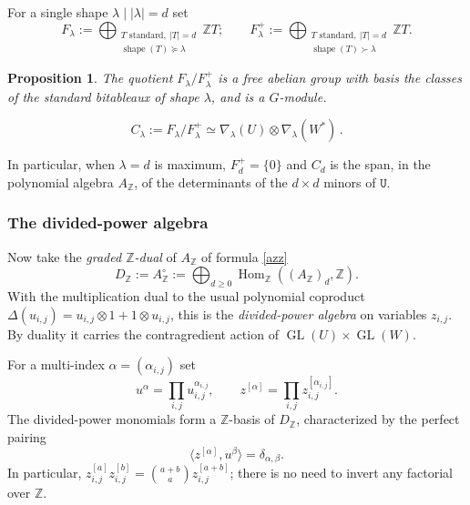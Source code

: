 \documentclass[10pt]{amsart}
\newtheorem{proposition}[theorem]{Proposition}
\theoremstyle{definition}
\theoremstyle{remark}
\newcommand{\GL}{\operatorname{GL}}
\begin{document}
 For a single shape
$\lambda \mid |\lambda|=d$ set
\begin{equation}\label{glifl}
F_{\lambda}:=
 \bigoplus_{\substack{T\text{ standard},\ |T|=d\\
                  \operatorname{shape}(T) \succeq \lambda}}
 \mathbb ZT;\qquad F^+_{\lambda}:=
 \bigoplus_{\substack{T\text{ standard},\ |T|=d\\
                  \operatorname{shape}(T)\succ \lambda}}
 \mathbb ZT. 
\end{equation} 
\begin{proposition}\label{grmod}
 The quotient $ F_\lambda/ F^+_{\lambda}$  is a free abelian group with basis the classes of the standard bitableaux of shape $\lambda$, and is a $G$-module.
 
 \begin{equation}\label{clam}
 C_\lambda:=F_\lambda/ F^+_{\lambda}\simeq\nabla_{\lambda}(U)\otimes\nabla_{\lambda}(W^{*})\,.
\end{equation}
\end{proposition}
In particular, when $\lambda=d$ is maximum, $F^+_{d}=\{0\}$  and $C_d$ is the span, in the polynomial algebra $A_{\mathbb Z}$, of the determinants of the $d\times d$ minors of $\mathtt U$.
 \smallskip


\subsubsection{The divided-power algebra}
Now take the \emph{graded $\mathbb Z$-dual} of $A_{\mathbb Z}$ of formula \eqref{azz}
\begin{equation}\label{podi}
 D_{\mathbb Z}:=A_{\mathbb Z}^{\circ}
 :=\bigoplus_{d\geq0}\operatorname{Hom}_{\mathbb Z}
 ((A_{\mathbb Z})_d,\mathbb Z).
\end{equation}
With the multiplication dual to the usual polynomial coproduct
$\Delta(u_{i,j})=u_{i,j}\otimes1+1\otimes u_{i,j}$,
this is the {\em divided-power algebra} on variables $z_{i,j}$.  By duality it carries the contragredient action of $\GL(U)\times\GL(W)$.\smallskip

For a multi-index $\alpha=(\alpha_{i,j})$ set
\[
  u^\alpha=\prod_{i,j} u_{i,j}^{\alpha_{i,j}},
 \qquad
 z^{[\alpha]}=\prod_{i,j}z_{i,j}^{[\alpha_{i,j}]}.
\]
The divided-power monomials form a $\mathbb Z$-basis of $D_{\mathbb Z}$,
characterized by the perfect pairing
\begin{equation}\label{eq:integral-divided-pairing}
 \langle z^{[\alpha]}, u^\beta\rangle=\delta_{\alpha,\beta}.
\end{equation}
In particular,
$z_{i,j}^{[a]}z_{i,j}^{[b]}=\binom{a+b}{a}z_{i,j}^{[a+b]}$;
there is no need to invert any factorial over $\mathbb Z$.\smallskip
\end{document}

